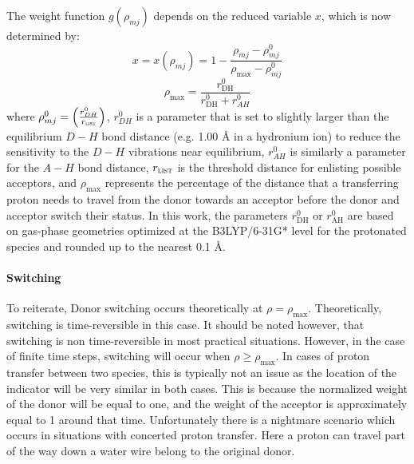 \documentclass{article}
\newcommand{\mr}[1]{\mathrm{#1}}
\begin{document}
The weight function $g ( \rho_{mj} )$ depends on the reduced variable $x$, which is now determined by:
\begin{equation}\label{eq:xmj}
x = x ( \rho_{mj} ) = 1 - \frac{\rho_{mj} - \rho^0_{mj}}{\rho_{\mathrm{max}} - \rho^0_{mj}}
\end{equation}
\begin{equation}
\rho_{\mathrm{max}} = \frac{r^0_{\mathrm{DH}}}{r^0_{\mathrm{DH}}+r^0_{AH}}
\end{equation}
where $\rho^0_{mj} = \left( \frac{r^0_{DH}}{r_{\mathrm{\textsc{list}}}} \right)$, $r^0_{DH}$ is a parameter that is set to slightly larger than the equilibrium $D-H$ bond distance (e.g. 1.00 \r{A} in a hydronium ion) to reduce the sensitivity to the $D-H$ vibrations near equilibrium, $r^0_{AH}$ is similarly a parameter for the $A-H$ bond distance,
$r_{\mathrm{\textsc{list}}}$ is the threshold distance for enlisting possible acceptors, and $\rho_{\mathrm{max}}$ represents the percentage of the distance that a transferring proton needs to travel from the donor towards an acceptor before the donor and acceptor switch their status.
In this work, the parameters $r^0_{\mr{DH}}$ or $r^0_{\mr{AH}}$ are based on gas-phase geometries optimized at the B3LYP/6-31G* level for the protonated species and rounded up to the nearest 0.1 \AA.

\paragraph{Switching}
To reiterate, Donor switching occurs theoretically at $\rho = \rho_{\mr{max}}$.
Theoretically, switching is time-reversible in this case.
It should be noted however, that switching is non time-reversible in most practical situations. 
However, in the case of finite time steps, switching will occur when $\rho \geq \rho_{\mr{max}}$.
In cases of proton transfer between two species, this is typically not an issue as the location of the indicator will be very similar in both cases.
This is because the normalized weight of the donor will be equal to one, and the weight of the acceptor is approximately equal to 1 around that time.
Unfortunately there is a nightmare scenario which occurs in situations with concerted proton transfer.
Here a proton can travel part of the way down a water wire belong to the original donor.
\end{document}
